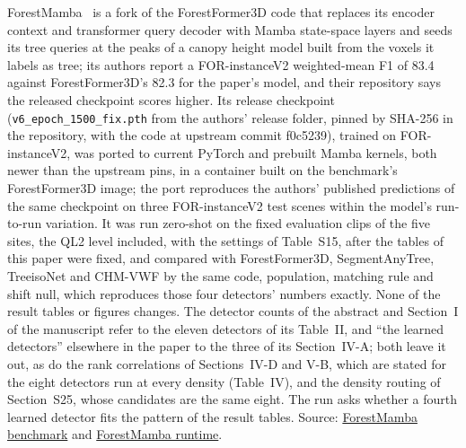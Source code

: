 \documentclass[10pt]{article}
\begin{document}
ForestMamba~\cite{nguyen2026forestmamba} is a fork of the ForestFormer3D code that
replaces its encoder context and transformer query decoder with Mamba
state-space layers and seeds its tree queries at the peaks of a canopy height
model built from the voxels it labels as tree; its authors report a
FOR-instanceV2 weighted-mean F1 of 83.4 against ForestFormer3D's 82.3 for the
paper's model, and their repository says the released checkpoint scores higher.
Its release checkpoint (\texttt{v6\_epoch\_1500\_fix.pth} from the authors' release
folder, pinned by SHA-256 in the repository, with the code at upstream commit
f0c5239), trained on FOR-instanceV2, was ported to current PyTorch and prebuilt
Mamba kernels, both newer than the upstream pins, in a container built on the
benchmark's ForestFormer3D image; the port reproduces the authors' published
predictions of the same checkpoint on three FOR-instanceV2 test scenes within
the model's run-to-run variation. It was run zero-shot on the fixed evaluation
clips of the five sites, the QL2 level included, with the settings of Table~S15,
after the tables of this paper were fixed, and compared with ForestFormer3D,
SegmentAnyTree, TreeisoNet and CHM-VWF by the same code, population, matching
rule and shift null, which reproduces those four detectors' numbers exactly.
None of the result tables or figures changes. The detector counts of the
abstract and Section~I of the manuscript refer to the eleven detectors of its
Table~II, and ``the learned detectors'' elsewhere in the paper to the three of its
Section~IV-A; both leave it out, as do the rank correlations of Sections~IV-D and
V-B, which are stated for the eight detectors run at every density (Table~IV),
and the density routing of Section~S25, whose candidates are the same eight. The
run asks whether a fourth learned detector fits the pattern of the result
tables. Source: \href{https://github.com/devakellc/lidar-tree-benchmark/blob/main/results/forestmamba-results.md}{ForestMamba benchmark} and
\href{https://github.com/devakellc/lidar-tree-benchmark/blob/main/gpu/forestmamba-sm120/README.md}{ForestMamba runtime}.
\end{document}
